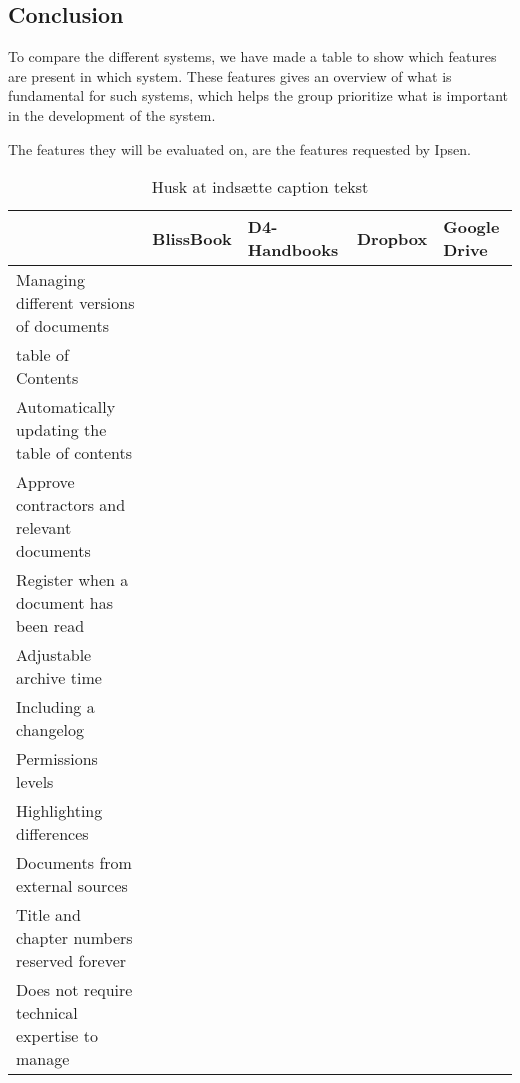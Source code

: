 \subsection{Conclusion}
To compare the different systems, we have made a table to show which features are present in which system. These features gives an overview of what is fundamental for such systems, which helps the group prioritize what is important in the development of the system.

The features they will be evaluated on, are the features requested by Ipsen.

\begin{table}[H]
	\begin{center}
		\begin{tabular}{| m{5cm}|m{1.6cm}|m{2cm}|m{1.5cm}|m{1.2cm}|}
			\hline
			 & BlissBook  & D4-Handbooks & Dropbox & Google \newline Drive \\ 
			\hline
			Managing different versions of documents & \checkmark &  &  & \\ 
			\hline
			table of Contents & \checkmark & \checkmark  & \checkmark & \checkmark \\ 
			\hline
			Automatically updating the table of contents & \checkmark & \checkmark  & \checkmark & \checkmark \\ 
			\hline
			Approve contractors and \newline relevant documents &  &  &  & \\ 
			\hline
			Register when a document has been read & \checkmark & \checkmark &  & \\ 
			\hline
			Adjustable archive time &  &  &  & \\ 
			\hline
			Including a changelog & \checkmark & \checkmark  & \checkmark & \checkmark \\ 
			\hline
			Permissions levels & \checkmark &  &  & \\ 
			\hline
			Highlighting differences & \checkmark &  &  & \\ 
			\hline
			Documents from external \newline sources &  &  & \checkmark & \checkmark \\ 
			\hline
			Title and chapter numbers \newline reserved forever &  &  &  & \\ 
			\hline
			Does not require technical \newline expertise to manage & \checkmark & \checkmark  & \checkmark & \checkmark \\ 
			\hline
		\end{tabular}
	\caption{{\color{red} Husk at indsætte caption tekst}}\label{tab:Exsisting}
	\end{center}
\end{table}

